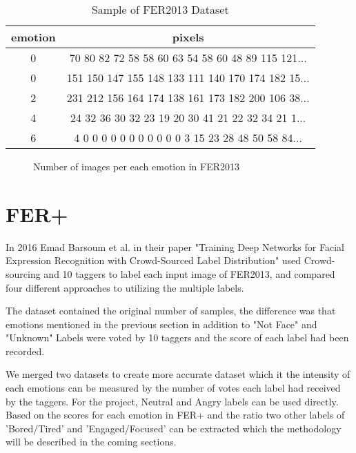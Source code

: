 \documentclass[]{report}
\begin{document}
\begin{table}
	\centering
	\caption{Sample of FER2013 Dataset}
	\begin{tabular}{| c | c |}
		
		\hline
		emotion &	pixels \\
		\hline
		0 &	70 80 82 72 58 58 60 63 54 58 60 48 89 115 121... \\ \hline
		0 &	151 150 147 155 148 133 111 140 170 174 182 15... \\ \hline
		2 &	231 212 156 164 174 138 161 173 182 200 106 38... \\ \hline
		4 &	24 32 36 30 32 23 19 20 30 41 21 22 32 34 21 1... \\ \hline
		6 &	4 0 0 0 0 0 0 0 0 0 0 0 3 15 23 28 48 50 58 84... \\ \hline
	\end{tabular}
\end{table}
\begin{figure}
	\centering
	
	\caption{Number of images per each emotion in FER2013}
\end{figure}
\section{FER+}
In 2016 Emad Barsoum et al. in their paper "Training Deep Networks for Facial Expression Recognition with Crowd-Sourced Label Distribution"\cite{barsoum2016training} used Crowd-sourcing and 10 taggers to label each input image of FER2013, and compared four different approaches to utilizing the multiple labels. 

The dataset contained the original number of samples, the difference was that emotions mentioned in the previous section in addition to "Not Face" and "Unknown" Labels were voted by 10 taggers and the score of each label had been recorded.

We merged two datasets to create more accurate dataset which it the intensity of each emotions can be measured by the number of votes each label had received by the taggers. For the project, Neutral and Angry labels can be used directly. Based on the scores for each emotion in FER+ and the ratio two other labels of 'Bored/Tired' and 'Engaged/Focused' can be extracted which the methodology will be described in the coming sections.
\end{document}
